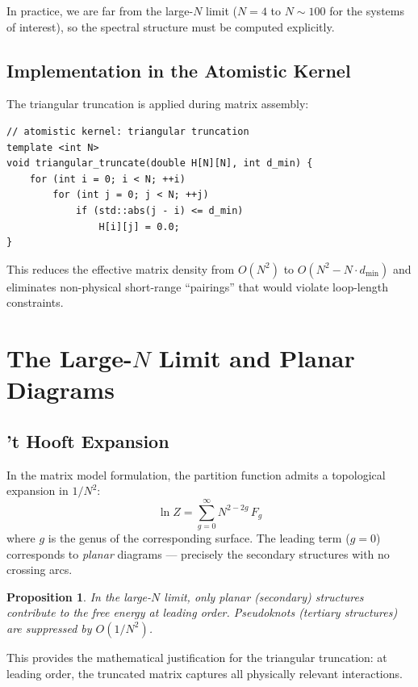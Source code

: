 \documentclass[11pt]{article}
\newtheorem{proposition}{Proposition}[section]
\begin{document}
In practice, we are far from the large-$N$ limit ($N = 4$ to $N \sim
100$ for the systems of interest), so the spectral structure must be
computed explicitly.

\subsection{Implementation in the Atomistic Kernel}

The triangular truncation is applied during matrix assembly:

\begin{lstlisting}
// atomistic kernel: triangular truncation
template <int N>
void triangular_truncate(double H[N][N], int d_min) {
    for (int i = 0; i < N; ++i)
        for (int j = 0; j < N; ++j)
            if (std::abs(j - i) <= d_min)
                H[i][j] = 0.0;
}
\end{lstlisting}

This reduces the effective matrix density from $O(N^2)$ to
$O(N^2 - N \cdot d_{\min})$ and eliminates non-physical short-range
``pairings'' that would violate loop-length constraints.

\section{The Large-$N$ Limit and Planar Diagrams}

\subsection{'t Hooft Expansion}

In the matrix model formulation, the partition function admits a
topological expansion in $1/N^2$:
\begin{equation}
  \ln Z = \sum_{g=0}^{\infty} N^{2-2g}\, F_g
\end{equation}
where $g$ is the genus of the corresponding surface.  The leading term
($g = 0$) corresponds to \emph{planar} diagrams --- precisely the
secondary structures with no crossing arcs.

\begin{proposition}
In the large-$N$ limit, only planar (secondary) structures contribute
to the free energy at leading order.  Pseudoknots (tertiary structures)
are suppressed by $O(1/N^2)$.
\end{proposition}

This provides the mathematical justification for the triangular
truncation: at leading order, the truncated matrix captures all
physically relevant interactions.
\end{document}
